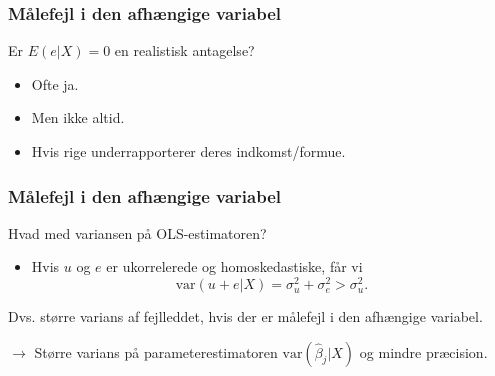 \documentclass[aspectratio=43,t]{beamer}
\begin{document}

\begin{frame}
\frametitle{Målefejl i den afhængige variabel}
	
	Er $E(e|X)=0$ en realistisk antagelse?
	
	\begin{itemize}
		\item Ofte ja.
		\medskip
		\item Men ikke altid.
		\medskip
		\item Hvis rige underrapporterer deres indkomst/formue.
	\end{itemize}

\end{frame}


\begin{frame}
\frametitle{Målefejl i den afhængige variabel}
	
	Hvad med variansen på OLS-estimatoren?
	
	\begin{itemize}
	\item Hvis $u$ og $e$ er ukorrelerede og homoskedastiske, får vi
	\begin{equation*}
	\text{var}(u+e|X) = \sigma_{u}^{2}+\sigma_{e}^{2} > \sigma_{u}^{2}.
	\end{equation*}
	\end{itemize}
	Dvs. større varians af fejlleddet, hvis der er målefejl i den afhængige variabel.

	$\rightarrow$ Større varians på parameterestimatoren $\text{var}(\hat{\beta}_{j}|X)$ og mindre præcision.

\end{frame}

\end{document}
